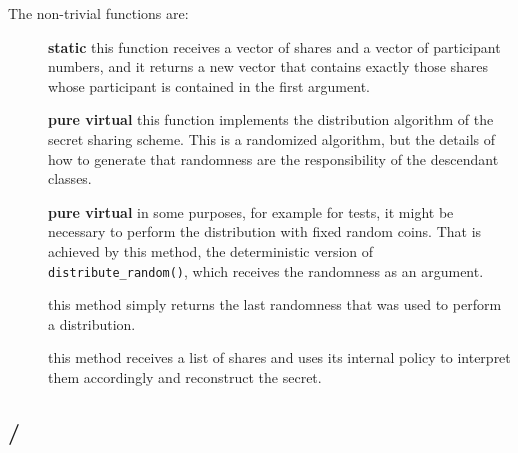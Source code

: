 \documentclass{article}
\begin{document}
The non-trivial functions are:
\begin{description}
\item[] {\bf static} this function receives a vector of shares and a vector of participant numbers, and it returns a new vector that contains exactly those shares whose participant is contained in the first argument.
\item[] {\bf pure virtual} this function implements the distribution algorithm of the secret sharing scheme. This is a randomized algorithm, but the details of how to generate that randomness are the responsibility of the descendant classes. 
\item[] {\bf pure virtual} in some purposes, for example for tests, it might be necessary to perform the distribution with fixed random coins. That is achieved by this method, the deterministic version of \verb|distribute_random()|, which receives the randomness as an argument.
\item[] this method simply returns the last randomness that was used to perform a distribution.
\item[] this method receives a list of shares and uses its internal policy to interpret them accordingly and reconstruct the secret.
\end{description}


\subsection{\fhkpabe / \fckpabe}
\end{document}
